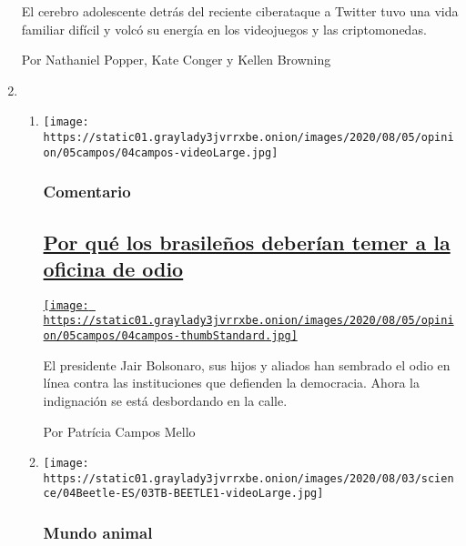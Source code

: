 \begin{enumerate}
  El cerebro adolescente detrás del reciente ciberataque a Twitter tuvo
  una vida familiar difícil y volcó su energía en los videojuegos y las
  criptomonedas.

  Por Nathaniel Popper, Kate Conger y Kellen Browning
\item
  \begin{enumerate}
  \def\labelenumii{\arabic{enumii}.}
  \item
    \texttt{[image: https://static01.graylady3jvrrxbe.onion/images/2020/08/05/opinion/05campos/04campos-videoLarge.jpg]}

    \hypertarget{comentario}{%
    \subsubsection{Comentario}\label{comentario}}

    \hypertarget{por-quuxe9-los-brasileuxf1os-deberuxedan-temer-a-la-oficina-de-odio}{%
    \subsection{\texorpdfstring{\href{/es/2020/08/04/espanol/opinion/bolsonaro-oficina-odio-brasil.html}{Por
    qué los brasileños deberían temer a la oficina de
    odio}}{Por qué los brasileños deberían temer a la oficina de odio}}\label{por-quuxe9-los-brasileuxf1os-deberuxedan-temer-a-la-oficina-de-odio}}

    \href{/es/2020/08/04/espanol/opinion/bolsonaro-oficina-odio-brasil.html}{\texttt{[image: https://static01.graylady3jvrrxbe.onion/images/2020/08/05/opinion/05campos/04campos-thumbStandard.jpg]}}

    El presidente Jair Bolsonaro, sus hijos y aliados han sembrado el
    odio en línea contra las instituciones que defienden la democracia.
    Ahora la indignación se está desbordando en la calle.

    Por Patrícia Campos Mello
  \item
    \texttt{[image: https://static01.graylady3jvrrxbe.onion/images/2020/08/03/science/04Beetle-ES/03TB-BEETLE1-videoLarge.jpg]}

    \hypertarget{mundo-animal}{%
    \subsubsection{Mundo animal}\label{mundo-animal}}

    \hypertarget{hay-dos-formas-de-salir-de-la-panza-de-una-rana-y-este-escarabajo-eligiuxf3-la-muxe1s-inesperada}{%
}
\end{enumerate}
\end{enumerate}
